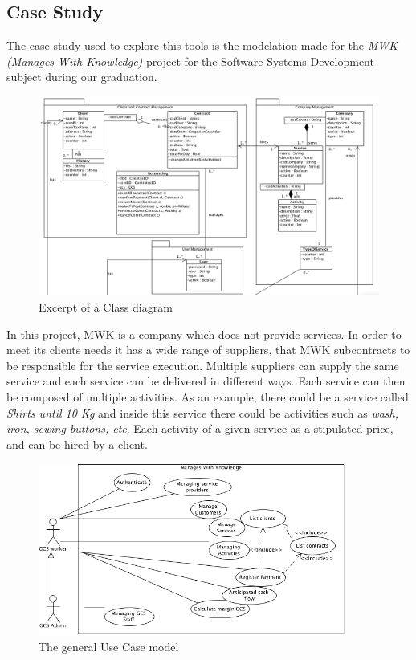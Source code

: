 \subsection*{Case Study}
The case-study used to explore this tools is the modelation made for the \textit{MWK (Manages With Knowledge)} project for the Software Systems Development subject during our graduation.

\begin{figure}[!htbp]
\begin{center}
\includegraphics[scale=0.345]{images/classbw.png}
\caption{Excerpt of a Class diagram}\label{fig:class}
\end{center}
\end{figure} 

In this project, MWK is a company which does not provide services. 
In order to meet its clients needs it has a wide range of suppliers, that MWK subcontracts to be responsible for the service execution.
Multiple suppliers can supply the same service and each  service can be delivered in different ways.
Each service can then be composed of multiple activities. As an example, there could be a service called \textit{Shirts until 10 Kg} and inside this service there could be activities such as \textit{wash, iron, sewing buttons, etc}.
Each activity of a given service as a stipulated price, and can be hired by a client.

\begin{figure}[!htbp]
\begin{center}
\includegraphics[width=0.9\textwidth]{images/usecase.png}
\caption{The general Use Case model}\label{fig:usecase}
\end{center}
\end{figure} 

